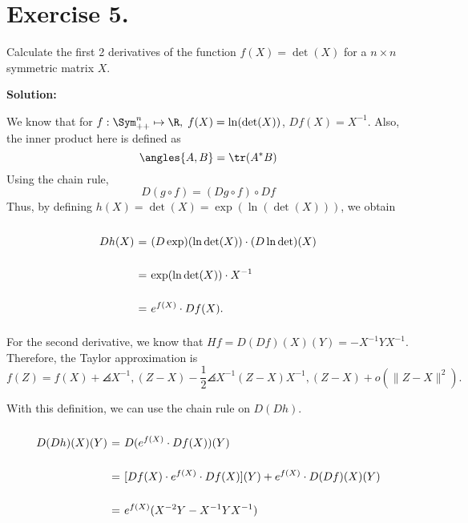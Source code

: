 \section*{Exercise 5.}

Calculate the first 2 derivatives of the function $f(X) = \det(X)$ for a $n\times n$ symmetric matrix $X$.

\textbf{Solution:}

We know that for $f: \Sym_{++}^{n} \mapsto \R,\; f(X) = \ln(\det(X))$, $Df(X) = X^{-1}$. Also, the inner product here is defined as
\[ \angles{A,B} = \tr(A^* B) \]
Using the chain rule,
\[ D(g\circ f) = (Dg \circ f) \circ Df \]
Thus, by defining $h(X) = \det(X) = \exp(\ln(\det(X)))$, we obtain
\[ \everymath{\displaystyle}
\arraycolsep=1.8pt\def\arraystretch{2.5}
\begin{array}{rcl}
    Dh(X) & = & (D\exp)(\ln\det(X)) \cdot (D\ln\det)(X) \\
    & = & \exp(\ln\det(X)) \cdot X^{-1}\\
    & = & e^{f(X)} \cdot Df(X).
\end{array} \]

For the second derivative, we know that $Hf = D(Df)(X)(Y) = - X^{-1} Y X^{-1}$. Therefore, the Taylor approximation is
\[ f(Z) = f(X) + \angles{X^{-1}, (Z-X)} - \frac{1}{2}\angles{X^{-1}(Z-X)X^{-1}, (Z-X)} + o(\|Z-X\|^{2}). \]

With this definition, we can use the chain rule on $D(Dh)$.
\[ \everymath{\displaystyle}
\arraycolsep=1.8pt\def\arraystretch{2.5}
\begin{array}{rcl}
    D(Dh)(X)(Y) & = & D(e^{f(X)}\cdot Df(X))(Y)\\
    & = & [Df(X)\cdot e^{f(X)}\cdot Df(X)](Y) + e^{f(X)} \cdot D(Df)(X)(Y)\\
    & = &  e^{f(X)}(X^{-2}Y - X^{-1}Y X^{-1})
\end{array} \]